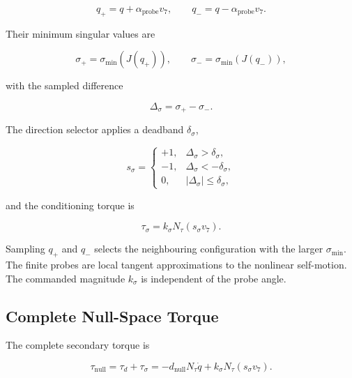 \begin{equation}
q_+=q+\alpha_{\mathrm{probe}}v_7,
\qquad
q_-=q-\alpha_{\mathrm{probe}}v_7.
\label{eq:nullspace_candidates}
\end{equation}

Their minimum singular values are

\begin{equation}
\sigma_+=\sigma_{\min}(J(q_+)),
\qquad
\sigma_-=\sigma_{\min}(J(q_-)),
\label{eq:nullspace_sampled_singular_values}
\end{equation}

with the sampled difference

\begin{equation}
\Delta_\sigma=\sigma_+-\sigma_-.
\label{eq:nullspace_singular_value_difference}
\end{equation}

The direction selector applies a deadband \mbox{\(\delta_\sigma\)},

\begin{equation}
s_\sigma=
\begin{cases}
+1,&\Delta_\sigma>\delta_\sigma,\\
-1,&\Delta_\sigma<-\delta_\sigma,\\
0,&|\Delta_\sigma|\leq\delta_\sigma,
\end{cases}
\label{eq:nullspace_direction_selection}
\end{equation}

and the conditioning torque is

\begin{equation}
\tau_\sigma=k_\sigma N_\tau(s_\sigma v_7).
\label{eq:nullspace_sigma_torque}
\end{equation}

Sampling \mbox{\(q_+\)} and \mbox{\(q_-\)} selects the neighbouring
configuration with the larger \mbox{\(\sigma_{\min}\)}. The finite probes are
local tangent approximations to the nonlinear self-motion. The commanded
magnitude \mbox{\(k_\sigma\)} is independent of the probe angle.

\subsection{Complete Null-Space Torque}
\label{subsec:complete_nullspace_torque}

The complete secondary torque is

\begin{equation}
\tau_{\mathrm{null}}
=\tau_d+\tau_\sigma
=-d_{\mathrm{null}}N_\tau\dot q
+k_\sigma N_\tau(s_\sigma v_7).
\label{eq:nullspace_torque}
\end{equation}

